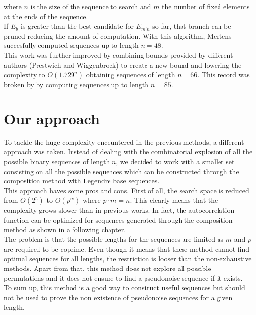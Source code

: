   where $n$ is the size of the sequence to search and $m$ the number of fixed
  elements at the ends of the sequence.\\

  If $E_b$ is greater than the best candidate for $E_{min}$ so far, that branch
  can be pruned reducing the amount of computation. With this algorithm,
  Mertens succesfully computed sequences up to length $n = 48$.\\

  This work was further improved by \citet{Packebusch_2016} combining bounds provided by different authors (Prestwich and
  Wiggenbrock) to create a new bound and  lowering the
  complexity to $O(1.729^n)$ obtaining sequences of length  $n= 66$. This
  record was broken by \citet{anatoli} by computing sequences up to length $n = 85$.\\

  \section{Our approach}

  To tackle the huge complexity encountered in the previous methods, a different
  approach was taken. Instead of dealing with the combinatorial explosion
  of all the possible binary sequences of length $n$, we decided to work with
  a smaller set consisting on all the possible sequences which can be
  constructed through the composition method with Legendre base sequences.\\

  This approach haves some pros and cons. First of all, the search space is
  reduced from $O(2^n)$ to $O(p^m)$ where $p \cdot m = n$. This clearly means that
  the complexity grows slower than in previous works. In fact, the
  autocorrelation function can be optimized for sequences generated through the
  composition method as shown in a following chapter. \\

  The problem is that the possible lengths for the sequences are limited as $m$
  and $p$ are required to be coprime. Even though it means that
  these method cannot find optimal sequences for all lengths, the restriction is
  looser than the non-exhaustive methods. Apart from that, this method does not
  explore all possible permutations and it does not ensure to find a pseudonoise
  sequence if it exists. To sum up, this method is a good way to construct useful sequences but should not
  be used to prove the non existence of pseudonoise sequences for a given
  length.\\


